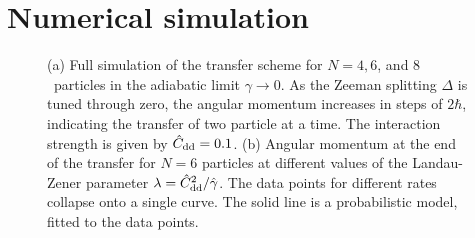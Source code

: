 \section{Numerical simulation}
\begin{figure}[t]
    \centering
    \caption{\label{fig:fig3}(a) Full simulation of the transfer scheme for $N=4,6$, and $8$~particles in the adiabatic limit $\gamma\rightarrow 0$. As the Zeeman splitting $\Delta$ is tuned through zero, the angular momentum increases in steps of $2\hbar$, indicating the transfer of two particle at a time. The interaction strength is given by ${\hat C}_\text{dd}=0.1$. (b) Angular momentum at the end of the transfer for $N=6$ particles at different values of the Landau-Zener parameter $\lambda={\hat C}_\text{dd}^2/{\hat \gamma}$. The data points for different rates collapse onto a single curve. The solid line is a probabilistic model, fitted to the data points.}
\end{figure}

